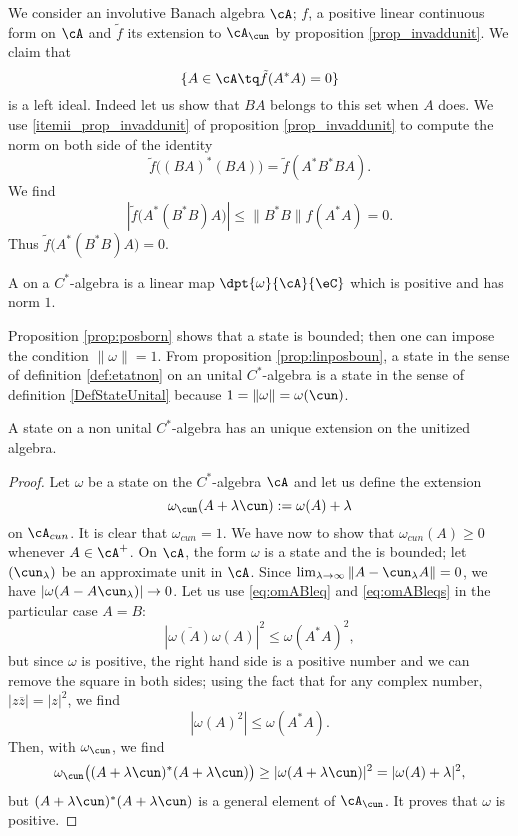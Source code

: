 We consider an involutive Banach algebra $\cA$; $f$, a positive linear continuous form on $\cA$ and $\tilde f$ its extension to $\cA_{\cun}$ by proposition \ref{prop_invaddunit}. We claim that 
\[ 
  \{ A\in\cA\tq \tilde f(A^*A)=0 \}
\]
is a left ideal. Indeed let us show that $BA$ belongs to this set when $A$ does. We use \ref{itemii_prop_invaddunit} of proposition \ref{prop_invaddunit} to compute the norm on both side of the identity
\[ 
  \tilde f\big( (BA)^*(BA) \big)=\tilde f(A^*B^*BA).
\]
We find
\[ 
  | \tilde f\big( A^*(B^*B)A \big) |\leq \| B^*B \|f(A^*A)=0.
\]
Thus $\tilde f\big( A^*(B^*B)A \big)=0$.


\begin{definition}      \label{DefStateCSA}
A  on a $C^*$-algebra is a linear map $\dpt{\omega}{\cA}{\eC}$ which is positive and has norm $1$.\label{def:etatnon}
\end{definition}
Proposition \ref{prop:posborn} shows that a state is bounded; then one can impose the condition $\| \omega \|=1$. From proposition \ref{prop:linposboun}, a state in the sense of definition \ref{def:etatnon} on an unital  $C^*$-algebra is a state in the sense of definition  \ref{DefStateUnital} because $1=\| \omega \|=\omega(\cun)$. 

\begin{proposition}
A state on a non unital $C^*$-algebra has an unique extension on the unitized algebra. \label{prop_st_unit_ext}
\end{proposition}

\begin{proof}
Let $\omega$ be a state on the $C^*$-algebra $\cA$ and let us define the extension
\[ 
  \omega_{\cun}(A+\lambda\cun):=\omega(A)+\lambda
\]
 on $\cA_{cun}$. It is clear that $\omega_{cun}=1$. We have now to show that $\omega_{cun}(A)\geq 0$ whenever $A\in\cA^+$. On $\cA$, the form $\omega$ is a state and the is bounded; let $(\cun_{\lambda})$ be an approximate unit in $\cA$. Since $\lim_{\lambda\to\infty}\| A-\cun_{\lambda}A \|=0$, we have $| \omega(A-A\cun_{\lambda}) |\to 0$. Let us use \eqref{eq:omABleq} and \eqref{eq:omABleqs} in the particular case $A=B$:
\[ 
  | \overline{\omega(A)}\omega(A) |^2\leq\omega(A^*A)^2,
\]
but since $\omega$ is positive, the right hand side is a positive number and we can remove the square in both sides; using the fact that for any complex number, $| z\overline{z} |=| z |^2$, we find
\[ 
  | \omega(A)^2 |\leq \omega(A^*A).
\]
Then, with $\omega_{\cun}$, we find
\[ 
  \omega_{\cun}\big( (A+\lambda\cun)^*(A+\lambda\cun) \big)\geq | \omega(A+\lambda\cun) |^2=| \omega(A)+\lambda |^2,
\]
but $(A+\lambda\cun)^*(A+\lambda\cun)$ is a general element of $\cA_{\cun}$. It proves that $\omega$ is positive.
 
\end{proof}


